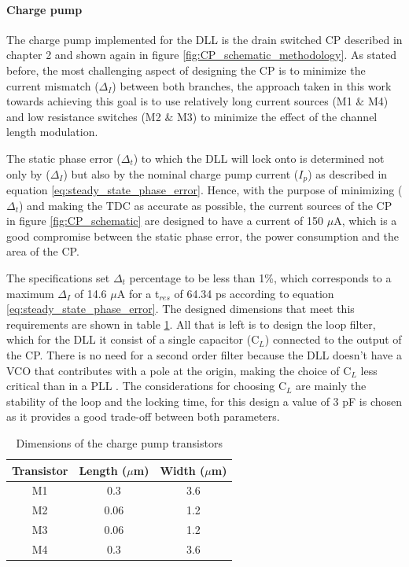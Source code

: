 \paragraph{Charge pump}
The charge pump implemented for the DLL is the drain switched CP described in chapter 2 and shown again in figure \ref{fig:CP_schematic_methodology}. As stated before, the most challenging
aspect of designing the CP is to minimize the current mismatch ($\Delta_I$) between both branches, the approach taken in this work towards achieving this goal is to use relatively long current sources
(M1 $\&$ M4) and low resistance switches (M2 $\&$ M3) to minimize the effect of the channel length modulation. 

The static phase error ($\Delta_t$) to which the DLL will lock onto is determined not only by ($\Delta_I$) but also by the nominal charge pump current ($I_p$) as described in
equation \ref{eq:steady_state_phase_error}. Hence, with the purpose of minimizing ($\Delta_t$) and making the TDC as accurate as possible, the current sources of the CP in 
figure \ref{fig:CP_schematic} are designed to have a current of 150 $\mu$A, which is a good compromise between the static phase error, the power consumption and the area of the CP.

The specifications set $\Delta_t$ percentage to be less than 1\%, which corresponds to a maximum $\Delta_I$ of 14.6 $\mu$A for a t$_{res}$ of 64.34 ps according to equation
\eqref{eq:steady_state_phase_error}. The designed dimensions that meet this requirements are shown in table \ref{tab:CP_dimensions}. All that is left is to design the loop filter,
which for the DLL it consist of a single capacitor (C$_L$) connected to the output of the CP. There is no need for a second order filter because the DLL doesn't have a VCO that 
contributes with a pole at the origin, making the choice of C$_L$ less critical than in a PLL \cite{bib:Razavi_DLL_paper}. The considerations for choosing C$_L$ are mainly the
stability of the loop and the locking time, for this design a value of 3 pF is chosen as it provides a good trade-off between both parameters.


\begin{table}[h]
    \centering
    \begin{tabular}{|c|c|c|}
        \hline
        \textbf{Transistor} & \textbf{Length ($\mu$m)} & \textbf{Width ($\mu$m)} \\
        \hline
        M1 & 0.3 & 3.6 \\
        M2 & 0.06 & 1.2 \\
        M3 & 0.06 & 1.2 \\
        M4 & 0.3 & 3.6 \\
        \hline
    \end{tabular}
    \caption{Dimensions of the charge pump transistors}
    \label{tab:CP_dimensions}
\end{table}


